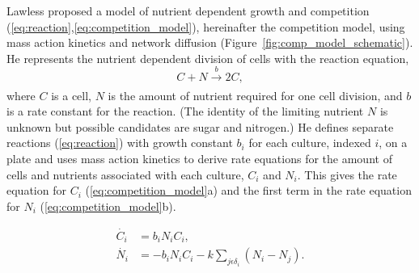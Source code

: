 Lawless proposed a model of nutrient dependent growth and
competition (\ref{eq:reaction},\ref{eq:competition_model}),
hereinafter the competition model, using mass action kinetics and
network diffusion (Figure~\ref{fig:comp_model_schematic}). He
represents the nutrient dependent division of cells with the reaction
equation,
\begin{equation}
  \label{eq:reaction}
    C + N \xrightarrow[]{b} 2C,
\end{equation}
where \(C\) is a cell, \(N\) is the amount of nutrient required for
one cell division, and \(b\) is a rate constant for the reaction. (The
identity of the limiting nutrient \(N\) is unknown but possible
candidates are sugar and nitrogen.) He defines separate reactions
(\ref{eq:reaction}) with growth constant \(b_{i}\) for each culture,
indexed \(i\), on a plate and uses mass action kinetics to derive rate
equations for the amount of cells and nutrients associated with each
culture, \(C_{i}\) and \(N_{i}\). This gives the rate equation for
\(C_{i}\) (\ref{eq:competition_model}a) and the first term in the rate
equation for \(N_{i}\) (\ref{eq:competition_model}b).

\begin{subequations}
  \label{eq:competition_model}
  \begin{align}
         \dot{C_{i}}& = b_{i}N_{i}C_{i},\\
         \dot{N_{i}}& = - b_{i}N_{i}C_{i} - k\sum_{j \epsilon \delta_i}(N_{i} - N_{j}).
  \end{align}
\end{subequations}


